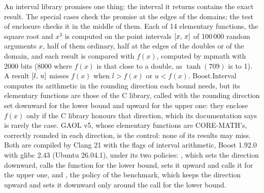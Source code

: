 An interval library promises one thing: the interval it returns contains
the exact result. The special cases check the promise at the edges of the
domains; the test of enclosure checks it in the middle of them. Each of 14
elementary functions, the square root and $x^3$ is computed on the point
intervals $[x,\,x]$ of 100\,000 random arguments $x$, half of them
ordinary, half at the edges of the doubles or of the domain, and each result
is compared with $f(x)$, computed by mpmath with 2000 bits (8000 where
$f(x)$ is that close to a double, as $\tanh(709)$ is to 1). A result
$[l,\,u]$ misses $f(x)$ when $l > f(x)$ or $u < f(x)$. Boost.Interval
computes its arithmetic in the rounding direction each bound needs, but its
elementary functions are those of the C library, called with the rounding
direction set downward for the lower bound and upward for the upper one:
they enclose $f(x)$ only if the C library honours that direction, which its
documentation says is rarely the case. GAOL v5, whose elementary functions
are CORE-MATH's, correctly rounded in each direction, is the control: none
of its results may miss. Both are compiled by Clang 21 with the flags of
interval arithmetic, Boost 1.92.0 with glibc 2.43 (Ubuntu 26.04.1), under
its two policies: , which sets the direction
downward, calls the function for the lower bound, sets it upward and calls
it for the upper one, and , the policy of the
benchmark, which keeps the direction upward and sets it downward only around
the call for the lower bound.

